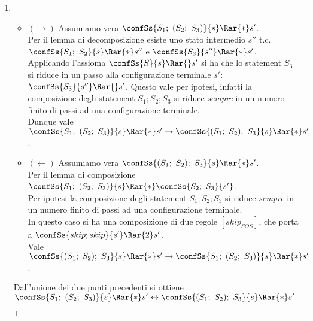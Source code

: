 {\begin{enumerate}[label=\alph*)]
    \item {} 
    \begin{itemize}
      \item $(\rightarrow)$ Assumiamo vera $\confSs{S_1; \ (S_2; \ S_3)}{s} 
      \Rar{*} s'$. \\
      Per il lemma di decomposizione esiste uno stato intermedio $s''$ t.c. 
      $\confSs{S_1; \ S_2}{s} \Rar{*} s''$ e $\confSs{S_3}{s''} \Rar{*} s'$. \\
      Applicando l'assioma $\confSs{S}{s} \Rar{} s'$ si ha che lo statement 
      $S_3$ si riduce in un passo alla configurazione terminale $s'$: 
      $\confSs{S_3}{s''} \Rar{} s'$. Questo vale per ipotesi, infatti la 
      composizione degli statement $S_1;S_2;S_3$ si riduce \textit{sempre} in 
      un numero finito di passi ad una configurazione terminale. \\
      Dunque vale 
      $\confSs{S_1; \ (S_2; \ S_3)}{s} \Rar{*} s' \rightarrow  
      \confSs{(S_1; \ S_2); \ S_3}{s} \Rar{*} s'$.
      \item $(\leftarrow)$ Assumiamo vera $\confSs{(S_1; \ S_2); \ S_3}{s} 
      \Rar{*} s'$. \\
      Per il lemma di composizione $\confSs{S_1; \ (S_2; \ S_3)}{s} 
      \Rar{*} \confSs{S_2; \ S_3}{s'}$. \\
      Per ipotesi la composizione degli statement $S_1;S_2;S_3$ si riduce 
      \textit{sempre} in un numero finito di passi ad una configurazione 
      terminale. \\ In questo caso si ha una composizione di due regole 
      $[skip_{SOS}]$, che porta a $\confSs{skip; skip}{s'} 
      \Rar{2} s'$. \\
      Vale $\confSs{(S_1; \ S_2); \ S_3}{s} \Rar{*} s' \rightarrow 
      \confSs{S_1; \ (S_2; \ S_3)}{s} \Rar{*} s'$.  
    \end{itemize}
         Dall'unione dei due punti precedenti si ottiene \\ 
         $\confSs{S_1; \ (S_2; \ S_3)}{s} \Rar{*} s' \leftrightarrow  
         \confSs{(S_1; \ S_2); \ S_3}{s} \Rar{*} s'$
         \begin{flushright}
         $\Box$
         \end{flushright}

  \end{enumerate}
}
